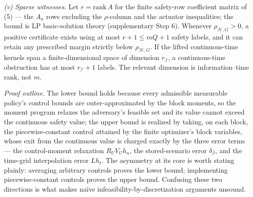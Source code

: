\documentclass[10pt,twocolumn]{article}
\theoremstyle{plain}
\theoremstyle{definition}
\theoremstyle{remark}
\begin{document}
\noindent\emph{(v) Sparse witnesses.} Let \(r = \mathrm{rank}\, A\) for the
finite safety-row coefficient matrix of (5) --- the \(A_a\) rows excluding
the \(\rho\)-column and the actuator inequalities; the bound is LP
basic-solution theory (supplementary Step 6). Whenever \(\rho_{\mathcal{H},G} > 0\), a
positive certificate exists using at most \(r + 1 \le mQ + 1\) safety labels,
and it can retain any prescribed margin strictly below
\(\rho_{\mathcal{H},G}\). If the lifted continuous-time kernels span a
finite-dimensional space of dimension \(r_{\mathcal{I}}\), a continuous-time
obstruction has at most \(r_{\mathcal{I}} + 1\) labels. The relevant
dimension is information--time rank, not \(m\).

\emph{Proof outline.} The lower bound holds because every admissible
measurable policy's control bounds are outer-approximated by the block
moments, so the moment program relaxes the adversary's feasible set and
its value cannot exceed the continuous safety value; the upper bound is
realized by taking, on each block, the piecewise-constant control attained
by the finite optimizer's block variables, whose exit from the continuous
value is charged exactly by the three error terms --- the control-moment
relaxation \(R_U V_U h_u\), the stored-scenario error \(\delta_\beta\),
and the time-grid interpolation error \(L h_t\). The asymmetry at its core is
worth stating plainly: averaging arbitrary controls proves the lower bound;
implementing piecewise-constant controls proves the upper bound. Confusing
these two directions is what makes na\"ive infeasibility-by-discretization
arguments unsound.
\end{document}
